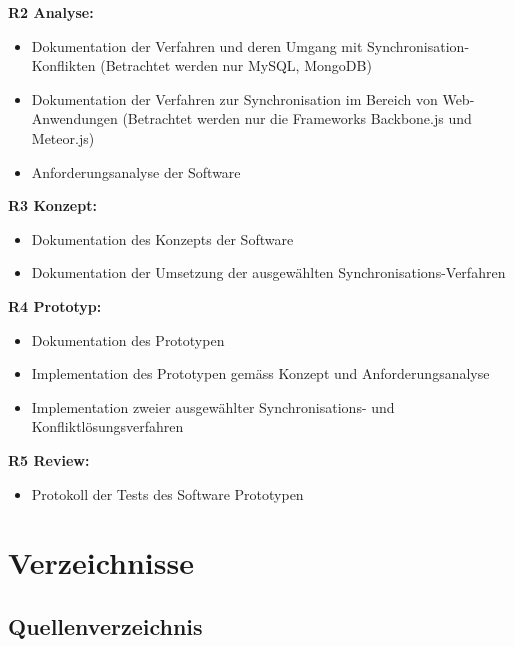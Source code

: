 \documentclass[oneside,11pt,parskip=half,ngerman]{scrreprt}
\begin{document}
\textbf{R2 Analyse:}

\begin{itemize}
\itemsep1pt\parskip0pt
\item
  Dokumentation der Verfahren und deren Umgang mit
  Synchronisation-Konflikten (Betrachtet werden nur MySQL, MongoDB)
\item
  Dokumentation der Verfahren zur Synchronisation im Bereich von
  Web-Anwendungen (Betrachtet werden nur die Frameworks Backbone.js und
  Meteor.js)
\item
  Anforderungsanalyse der Software
\end{itemize}

\textbf{R3 Konzept:}

\begin{itemize}
\itemsep1pt\parskip0pt
\item
  Dokumentation des Konzepts der Software
\item
  Dokumentation der Umsetzung der ausgewählten
  Synchronisations-Verfahren
\end{itemize}

\textbf{R4 Prototyp:}

\begin{itemize}
\itemsep1pt\parskip0pt
\item
  Dokumentation des Prototypen
\item
  Implementation des Prototypen gemäss Konzept und Anforderungsanalyse
\item
  Implementation zweier ausgewählter Synchronisations- und
  Konfliktlösungsverfahren
\end{itemize}

\textbf{R5 Review:}

\begin{itemize}
\itemsep1pt\parskip0pt
\item
  Protokoll der Tests des Software Prototypen
\end{itemize}

\chapter{Verzeichnisse}\label{verzeichnisse}

\section{Quellenverzeichnis}\label{quellenverzeichnis}

\vspace*{-2.5cm}\renewcommand{\bibname}{}\begingroup \let\clearpage\relax
\printbibliography
\endgroup
\end{document}
